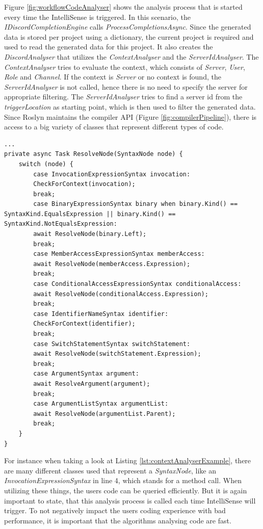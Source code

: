 Figure \ref{fig:workflowCodeAnalyser} shows the analysis process that is started every time the IntelliSense is triggered. In this scenario, the \textit{IDiscordCompletionEngine} calls \textit{ProcessCompletionsAsync}. Since the generated data is stored per project using a dictionary, the current project is required and used to read the generated data for this project. It also creates the \textit{DiscordAnalyser} that utilizes the \textit{ContextAnalyser} and the \textit{ServerIdAnalyser}. The \textit{ContextAnalyser} tries to evaluate the context, which consists of \textit{Server}, \textit{User}, \textit{Role} and \textit{Channel}. If the context is \textit{Server} or no context is found, the \textit{ServerIdAnalyser} is not called, hence there is no need to specify the server for appropriate filtering. The \textit{ServerIdAnalyser} tries to find a server id from the \textit{triggerLocation} as starting point, which is then used to filter the generated data. Since Roslyn maintains the compiler API (Figure \ref{fig:compilerPipeline}), there is access to a big variety of classes that represent different types of code.

\begin{lstlisting}[style=CSharp, caption={Code snippet from the context analyser}, label={lst:contextAnalyserExample}]
...
private async Task ResolveNode(SyntaxNode node) {
	switch (node) {
		case InvocationExpressionSyntax invocation:
		CheckForContext(invocation);
		break;
		case BinaryExpressionSyntax binary when binary.Kind() == SyntaxKind.EqualsExpression || binary.Kind() == SyntaxKind.NotEqualsExpression:
		await ResolveNode(binary.Left);
		break;
		case MemberAccessExpressionSyntax memberAccess:
		await ResolveNode(memberAccess.Expression);
		break;
		case ConditionalAccessExpressionSyntax conditionalAccess:
		await ResolveNode(conditionalAccess.Expression);
		break;
		case IdentifierNameSyntax identifier:
		CheckForContext(identifier);
		break;
		case SwitchStatementSyntax switchStatement:
		await ResolveNode(switchStatement.Expression);
		break;
		case ArgumentSyntax argument:
		await ResolveArgument(argument);
		break;
		case ArgumentListSyntax argumentList:
		await ResolveNode(argumentList.Parent);
		break;
	}
}
\end{lstlisting}
For instance when taking a look at Listing \ref{lst:contextAnalyserExample}, there are many different classes used that represent a \csharp \textit{SyntaxNode}, like an \textit{InvocationExpressionSyntax} in line 4, which stands for a method call. When utilizing these things, the users code can be queried efficiently. But it is again important to state, that this analysis process is called each time IntelliSense will trigger. To not negatively impact the users coding experience with bad performance, it is important that the algorithms analysing code are fast.

